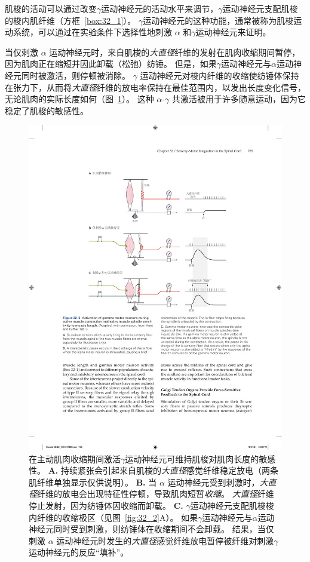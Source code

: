 肌梭的活动可以通过改变$ \gamma $运动神经元的活动水平来调节，$ \gamma $运动神经元支配肌梭的梭内肌纤维（方框~\ref{box:32_1}）。
$ \gamma $运动神经元的这种功能，通常被称为肌梭运动系统，可以通过在实验条件下选择性地刺激 $ \alpha $ 和$ \gamma $运动神经元来证明。


当仅刺激 $ \alpha $ 运动神经元时，来自肌梭的\textit{大直径}纤维的发射在肌肉收缩期间暂停，因为肌肉正在缩短并因此卸载（松弛）纺锤。
但是，如果$ \gamma $运动神经元与$ \alpha $运动神经元同时被激活，则停顿被消除。
$ \gamma $ 运动神经元对梭内纤维的收缩使纺锤体保持在张力下，从而将\textit{大直径}纤维的放电率保持在最佳范围内，以发出长度变化信号，无论肌肉的实际长度如何（图~\ref{fig:32_5}）。 
这种 $ \alpha $-$ \gamma $ 共激活被用于许多随意运动，因为它稳定了肌梭的敏感性。


\begin{figure}[htbp]
	\centering
	\includegraphics[width=0.92\linewidth]{chap32/fig_32_5}
	\caption{在主动肌肉收缩期间激活$ \gamma $运动神经元可维持肌梭对肌肉长度的敏感性\cite{hunt1951stretch}。
	\textbf{A.} 持续紧张会引起来自肌梭的\textit{大直径}感觉纤维稳定放电（两条肌纤维单独显示仅供说明）。
	\textbf{B.} 当 $ \alpha $ 运动神经元受到刺激时，\textit{大直径}纤维的放电会出现特征性停顿，导致肌肉短暂\textit{收缩}。
	\textit{大直径}纤维停止发射，因为纺锤体因收缩而卸载。
	\textbf{C.} $ \gamma $运动神经元支配肌梭梭内纤维的收缩极区（见图~\ref{fig:32_2}A）。
	如果$ \gamma $运动神经元与$ \alpha $运动神经元同时受到刺激，则纺锤体在收缩期间不会卸载。
	结果，当仅刺激 $ \alpha $ 运动神经元时发生的\textit{大直径}感觉纤维放电暂停被纤维对刺激$ \gamma $运动神经元的反应“填补”。}
	\label{fig:32_5}
\end{figure}


